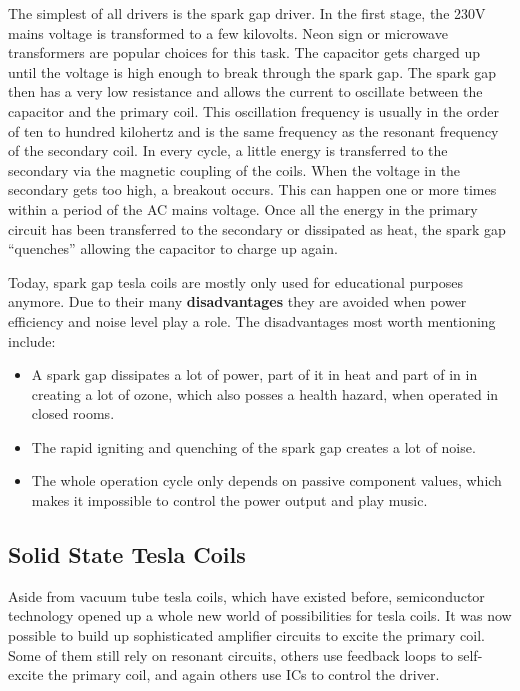 The simplest of all drivers is the spark gap driver. In the first stage, the 230V mains voltage is transformed to a few kilovolts. Neon sign or microwave transformers are popular choices for this task. The capacitor gets charged up until the voltage is high enough to break through the spark gap. The spark gap then has a very low resistance and allows the current to oscillate between the capacitor and the primary coil. This oscillation frequency is usually in the order of ten to hundred kilohertz and is the same frequency as the resonant frequency of the secondary coil. In every cycle, a little energy is transferred to the secondary via the magnetic coupling of the coils. When the voltage in the secondary gets too high, a breakout occurs. This can happen one or more times within a period of the AC mains voltage. Once all the energy in the primary circuit has been transferred to the secondary or dissipated as heat, the spark gap \enquote{quenches} allowing the capacitor to charge up again.

Today, spark gap tesla coils are mostly only used for educational purposes anymore. Due to their many \textbf{disadvantages} they are avoided when power efficiency and noise level play a role. The disadvantages most worth mentioning include:

\begin{itemize}
\item A spark gap dissipates a lot of power, part of it in heat and part of in in creating a lot of ozone, which also posses a health hazard, when operated in closed rooms.
\item The rapid igniting and quenching of the spark gap creates a lot of noise.
\item The whole operation cycle only depends on passive component values, which makes it impossible to control the power output and play music.
\end{itemize}

\subsection{Solid State Tesla Coils}

Aside from vacuum tube tesla coils, which have existed before, semiconductor technology opened up a whole new world of possibilities for tesla coils. It was now possible to build up sophisticated amplifier circuits to excite the primary coil. Some of them still rely on resonant circuits, others use feedback loops to self-excite the primary coil, and again others use ICs to control the driver.

